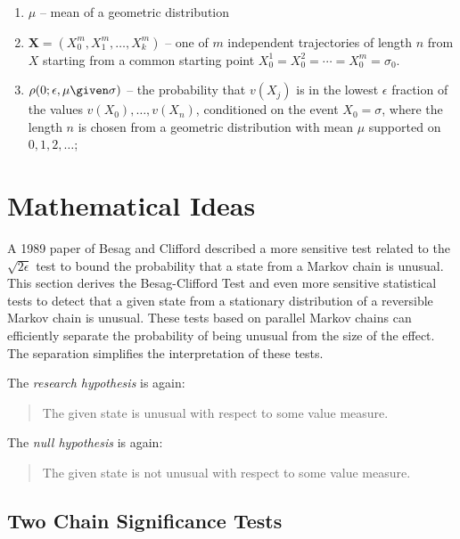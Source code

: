 \documentclass[12pt]{article}
\begin{document}
\begin{enumerate}
    \item
        \( \mu \) -- mean of a geometric distribution
    \item
        \( \mathbf{X} = (X_0^m, X_1^m, \dots, X_k^m) \) -- one of \( m \)
        independent trajectories of length \( n \) from \( X \) starting
        from a common starting point \( X_0^1 = X_0^2 = \cdots = X_0^m =
        \sigma_0 \).
    \item
        \( \rho(0; \epsilon, \mu \given \sigma) \) -- the probability
        that \( v(X_j) \) is in the lowest \( \epsilon \) fraction of
        the values \( v(X_0), \dots, v(X_n) \), conditioned on the event
        \( X_0 = \sigma \), where the length \( n \) is chosen from a
        geometric distribution with mean \( \mu \) supported on \(
        0,1,2,\dots \);
\end{enumerate}
\section*{Mathematical Ideas}

A 1989 paper of Besag and Clifford
\cite{besag89} described a more sensitive test related to the \( \sqrt{2\epsilon}
\) test %
to bound the probability that a state from a Markov chain is unusual.
This section derives the Besag-Clifford Test and even more sensitive
statistical tests to detect that a given state from a stationary
distribution of a reversible Markov chain is unusual. These tests based
on parallel Markov chains can efficiently separate the probability of
being unusual from the size of the effect. The separation simplifies the
interpretation of these tests.

The \emph{research hypothesis} is again:
\begin{quote}
    The given state is unusual with respect to some value measure.
\end{quote}
The \emph{null hypothesis} is again:
\begin{quote}
    The given state is not unusual with respect to some value measure.
\end{quote}

\subsection*{Two Chain Significance Tests}
\end{document}
